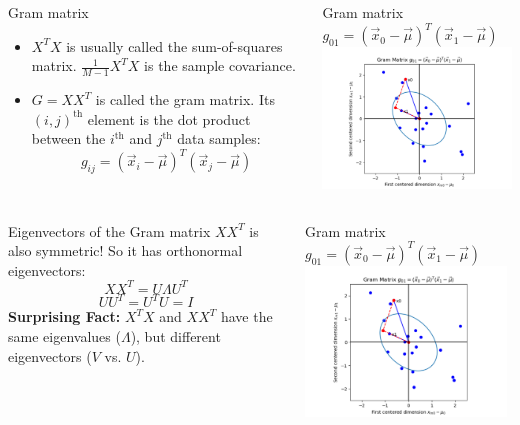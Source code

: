 \documentclass{beamer}
\begin{document}
\begin{frame}
  \begin{columns}
    \column{2.125in}
    \begin{block}{Gram matrix}
      \begin{itemize}
      \item $X^TX$ is usually called the sum-of-squares matrix.
        $\frac{1}{M-1}X^TX$ is the sample covariance.
      \item $G=XX^T$ is called the gram matrix.
        Its $(i,j)^{\textrm{th}}$ element is the dot product between
        the $i^{\textrm{th}}$ and $j^{\textrm{th}}$ data samples:
        \[
        g_{ij}=(\vec{x}_i-\vec\mu)^T(\vec{x}_j-\vec\mu)
        \]
      \end{itemize}
    \end{block}
    \column{2.125in}
    \begin{block}{Gram matrix $g_{01}=(\vec{x}_0-\vec\mu)^T(\vec{x}_1-\vec\mu)$}
      \includegraphics[width=2.1in]{gram_matrix.png}
    \end{block}
  \end{columns}
\end{frame}

\begin{frame}
  \begin{columns}
    \column{2.125in}
    \begin{block}{Eigenvectors of the Gram matrix}
      $XX^T$ is also symmetric!  So it has orthonormal eigenvectors:
      \[
      XX^T=U\Lambda U^T
      \]
      \[
      UU^T=U^TU=I
      \]
      {\bf Surprising Fact:}
      $X^TX$ and $XX^T$ have the same eigenvalues ($\Lambda$),
      but different eigenvectors ($V$ vs. $U$).
    \end{block}
    \column{2.125in}
    \begin{block}{Gram matrix $g_{01}=(\vec{x}_0-\vec\mu)^T(\vec{x}_1-\vec\mu)$}
      \includegraphics[width=2.1in]{gram_matrix.png}
    \end{block}
  \end{columns}
\end{frame}
\end{document}
